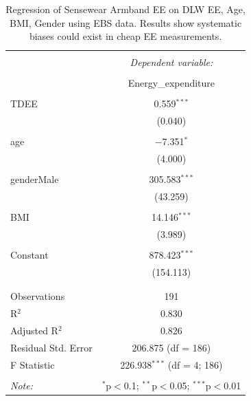 \documentclass[11pt]{article}\usepackage[]{graphicx}\usepackage[]{color}
\begin{document}
\begin{table}[!htbp] \centering 
  \caption{Regression of Sensewear Armband EE on DLW EE, Age, BMI, Gender using EBS data. Results show systematic biases could exist in cheap EE measurements.} 
  \label{ebslm} 
\begin{tabular}{@{\extracolsep{5pt}}lc} 
\\[-1.8ex]\hline 
\hline \\[-1.8ex] 
 & \multicolumn{1}{c}{\textit{Dependent variable:}} \\ 
\cline{2-2} 
\\[-1.8ex] & Energy\_expenditure \\ 
\hline \\[-1.8ex] 
 TDEE & 0.559$^{***}$ \\ 
  & (0.040) \\ 
  & \\ 
 age & $-$7.351$^{*}$ \\ 
  & (4.000) \\ 
  & \\ 
 genderMale & 305.583$^{***}$ \\ 
  & (43.259) \\ 
  & \\ 
 BMI & 14.146$^{***}$ \\ 
  & (3.989) \\ 
  & \\ 
 Constant & 878.423$^{***}$ \\ 
  & (154.113) \\ 
  & \\ 
\hline \\[-1.8ex] 
Observations & 191 \\ 
R$^{2}$ & 0.830 \\ 
Adjusted R$^{2}$ & 0.826 \\ 
Residual Std. Error & 206.875 (df = 186) \\ 
F Statistic & 226.938$^{***}$ (df = 4; 186) \\ 
\hline 
\hline \\[-1.8ex] 
\textit{Note:}  & \multicolumn{1}{r}{$^{*}$p$<$0.1; $^{**}$p$<$0.05; $^{***}$p$<$0.01} \\ 
\end{tabular} 
\end{table} 



\end{document}
